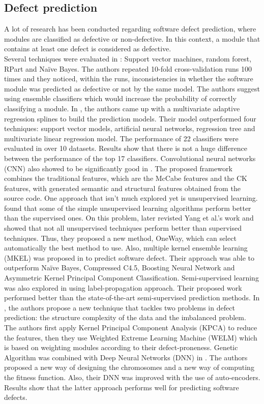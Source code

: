\documentclass[]{article}
\begin{document}
	\subsection{Defect prediction}
	A lot of research has been conducted regarding software defect prediction, where modules are classified as defective or non-defective. In this context, a module that contains at least one defect is considered as defective. \\
	Several techniques were evaluated in \cite{bowes2018software}: Support vector machines, random forest, RPart and Naïve Bayes. The authors repeated 10-fold cross-validation runs 100 times and they noticed, within the runs, inconsistencies in whether the software module was predicted as defective or not by the same model. The authors suggest using ensemble classifiers which would increase the probability of correctly classifying a module. In \cite{zhou2007predicting}, the authors came up with a multivariate adaptive regression splines to build the prediction models. Their model outperformed four techniques: support vector models, artificial neural networks, regression tree and multivariate linear regression model. The performance of 22 classifiers were evaluated in \cite{lessmann2008benchmarking} over 10 datasets. Results show that there is not a huge difference between the performance of the top 17 classifiers. Convolutional neural networks (CNN) also showed to be significantly good in \cite{li2017software}. The proposed framework combines the traditional features, which are the McCabe features and the CK features, with generated semantic and structural features obtained from the source code. One approach that isn't much explored yet is unsupervised learning. \cite{yang2016effort} found that some of the simple unsupervised learning algorithms perform better than the supervised ones. On this problem, \cite{fu2017revisiting} later revisted Yang et al.'s work and showed that not all unsupervised techniques perform better than supervised techniques. Thus, they proposed a new method, OneWay, which can select automatically the best method to use. Also, multiple kernel ensemble learning (MKEL) was proposed in \cite{wang2016multiple} to predict software defect. Their approach was able to outperform Naïve Bayes, Compressed C4.5, Boosting Neural Network and Asymmetric Kernel Principal Component Classification. Semi-supervised learning was also explored in \cite{zhang2017label} using label-propagation approach. Their proposed work performed better than the state-of-the-art semi-supervised prediction methods. In \cite{xu2019software}, the authors propose a new technique that tackles two problems in defect prediction: the structure complexity of the data and the imbalanced problem. The authors first apply Kernel Principal Component Analysis (KPCA) to reduce the features, then they use Weighted Extreme Learning Machine (WELM) which is based on weighting modules according to their defect-proneness. Genetic Algorithm was combined with Deep Neural Networks (DNN) in \cite{manjula2019deep}. The authors proposed a new way of designing the chromosomes and a new way of computing the fitness function. Also, their DNN was improved with the use of auto-encoders. Results show that the latter approach performs well for predicting software defects. \\
\end{document}
